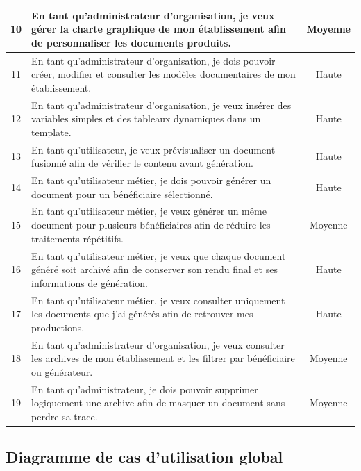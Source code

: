 \begin{longtable}{|c|m{11cm}|c|}
10 & En tant qu'administrateur d'organisation, je veux gérer la charte graphique de mon établissement afin de personnaliser les documents produits. & Moyenne \\
\hline

11 & En tant qu'administrateur d'organisation, je dois pouvoir créer, modifier et consulter les modèles documentaires de mon établissement. & Haute \\
\hline

12 & En tant qu'administrateur d'organisation, je veux insérer des variables simples et des tableaux dynamiques dans un template. & Haute \\
\hline

13 & En tant qu'utilisateur, je veux prévisualiser un document fusionné afin de vérifier le contenu avant génération. & Haute \\
\hline

14 & En tant qu'utilisateur métier, je dois pouvoir générer un document pour un bénéficiaire sélectionné. & Haute \\
\hline

15 & En tant qu'utilisateur métier, je veux générer un même document pour plusieurs bénéficiaires afin de réduire les traitements répétitifs. & Moyenne \\
\hline

16 & En tant qu'utilisateur métier, je veux que chaque document généré soit archivé afin de conserver son rendu final et ses informations de génération. & Haute \\
\hline

17 & En tant qu'utilisateur métier, je veux consulter uniquement les documents que j'ai générés afin de retrouver mes productions. & Haute \\
\hline

18 & En tant qu'administrateur d'organisation, je veux consulter les archives de mon établissement et les filtrer par bénéficiaire ou générateur. & Moyenne \\
\hline

19 & En tant qu'administrateur, je dois pouvoir supprimer logiquement une archive afin de masquer un document sans perdre sa trace. & Moyenne \\
\hline

\end{longtable}

\subsection{Diagramme de cas d'utilisation global}

